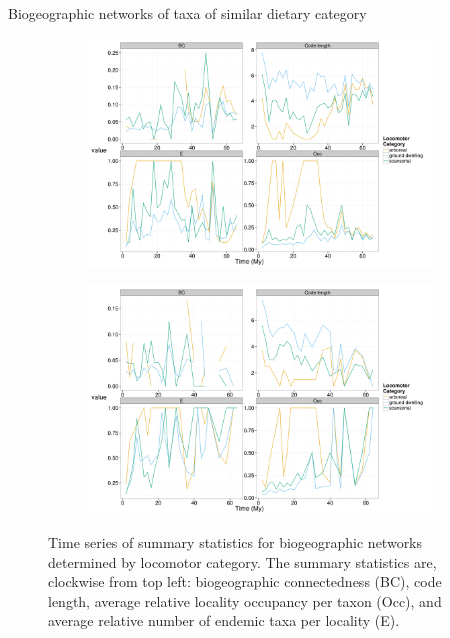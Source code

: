 \documentclass[12pt,letterpaper]{article}
\begin{document}
Biogeographic networks of taxa of similar dietary category

\begin{figure}[ht]
  \begin{center}
    \begin{subfigure}[b]{0.4\textwidth}
      \caption{}
      \includegraphics[width = \textwidth, keepaspectratio = true]{figure/na_lf}
      \label{subfig:loco_con_na}
    \end{subfigure}
    \begin{subfigure}[b]{0.4\textwidth}
      \caption{}
      \includegraphics[width = \textwidth, keepaspectratio = true]{figure/er_lf}
      \label{subfig:loco_con_er}
    \end{subfigure}
  \end{center}
  \caption[Locomotor category based community connectedness]{Time series of summary statistics for biogeographic networks determined by locomotor category. The summary statistics are, clockwise from top left: biogeographic connectedness (BC), code length, average relative locality occupancy per taxon (Occ), and average relative number of endemic taxa per locality (E).} 
  \label{fig:loco_con}
\end{figure}
\end{document}
